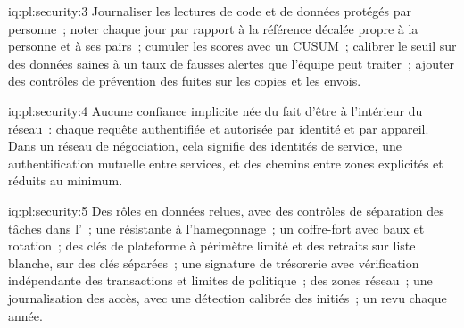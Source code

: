 \begin{solution}{iq:pl:security:3}
Journaliser les lectures de code et de données protégés par personne~; noter chaque jour par rapport à la référence décalée propre à la personne et à ses pairs~; cumuler les
scores avec un CUSUM~; calibrer le seuil sur des données saines à un taux de fausses alertes que l'équipe peut traiter~; ajouter des contrôles de prévention des fuites sur les copies
et les envois.
\end{solution}

\begin{solution}{iq:pl:security:4}
Aucune confiance implicite née du fait d'être à l'intérieur du réseau~: chaque requête authentifiée et autorisée par identité et par appareil. Dans un réseau de négociation,
cela signifie des identités de service, une authentification mutuelle entre services, et des chemins entre zones explicités et réduits au minimum.
\end{solution}

\begin{solution}{iq:pl:security:5}
Des rôles en données relues, avec des contrôles de séparation des tâches dans l'~; une  résistante à l'hameçonnage~; un coffre-fort avec baux et
rotation~; des clés de plateforme à périmètre limité et des retraits sur liste blanche, sur des clés séparées~; une signature de trésorerie avec vérification indépendante des transactions et
limites de politique~; des zones réseau~; une journalisation des accès, avec une détection calibrée des initiés~; un  revu chaque année.
\end{solution}
